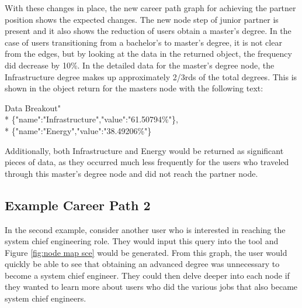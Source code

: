With these changes in place, the new career path graph for achieving the partner
position shows the expected changes.  The new node step of junior partner is
present and it also shows the reduction of users obtain a master's degree.  In
the case of users transitioning from a bachelor's to master's degree, it is not
clear from the edges, but by looking at the data in the returned object, the
frequency did decrease by 10\%.  In the detailed data for the master's degree
node, the Infrastructure degree makes up approximately 2/3rds of the total
degrees.  This is shown in the object return for the masters node with the
following text:

\begin{tt}
\begin{footnotesize}
\indent Data Breakout"\\*
\indent \indent \indent \{"name":"Infrastructure","value":"61.50794\%"\},\\*
\indent \indent \indent \{"name":"Energy","value":"38.49206\%"\}
\end{footnotesize}
\end{tt}

\noindent Additionally, both Infrastructure and Energy would be returned as
significant pieces of data, as they occurred much less frequently for the users
who traveled through this master's degree node and did not reach the partner
node.

\subsection{Example Career Path 2 }
In the second example, consider another user who is interested in reaching the
system chief engineering role.  They would input this query into the tool and
Figure \ref{fig:node map sce} would be generated.  From this graph, the user
would quickly be able to see that obtaining an advanced degree was unnecessary
to become a system chief engineer.  They could then delve deeper into each node
if they wanted to learn more about users who did the various jobs that also
became system chief engineers.


\usetikzlibrary{shapes,arrows,chains}

